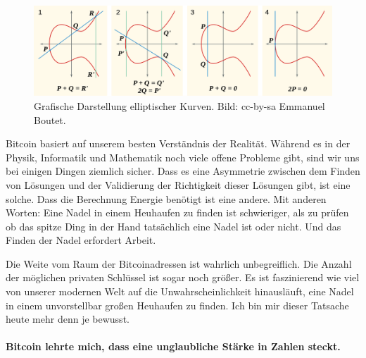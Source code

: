 \begin{figure}
  \includegraphics[width=\textwidth]{assets/images/elliptic-curve-examples.png}
  \caption{Grafische Darstellung elliptischer Kurven. Bild: cc-by-sa Emmanuel Boutet.}
  \label{fig:elliptic-curve-examples}
\end{figure}

Bitcoin basiert auf unserem besten Verständnis der Realität. Während es in der
Physik, Informatik und Mathematik noch viele offene Probleme gibt, sind wir uns
bei einigen Dingen ziemlich sicher. Dass es eine Asymmetrie zwischen dem Finden
von Lösungen und der Validierung der Richtigkeit dieser Lösungen gibt, ist eine
solche. Dass die Berechnung Energie benötigt ist eine andere. Mit anderen
Worten: Eine Nadel in einem Heuhaufen zu finden ist schwieriger, als zu prüfen
ob das spitze Ding in der Hand tatsächlich eine Nadel ist oder nicht. Und das
Finden der Nadel erfordert Arbeit.

Die Weite vom Raum der Bitcoinadressen ist wahrlich unbegreiflich. Die Anzahl
der möglichen privaten Schlüssel ist sogar noch größer. Es ist faszinierend wie
viel von unserer modernen Welt auf die Unwahrscheinlichkeit hinausläuft, eine
Nadel in einem unvorstellbar großen Heuhaufen zu finden. Ich bin mir dieser
Tatsache heute mehr denn je bewusst.

\paragraph{Bitcoin lehrte mich, dass eine unglaubliche Stärke in Zahlen steckt.}


